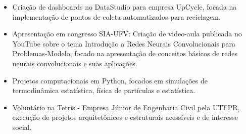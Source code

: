 \documentclass[10pt,a4paper,ragged2e]{altacv}
\begin{document}
\begin{itemize}
\item Criação de dashboards no DataStudio para empresa UpCycle, focada na implementação de pontos de coleta automatizados para reciclagem.\\
\item Apresentação em congresso SIA-UFV: Criação de video-aula publicada no YouTube sobre o tema Introdução a Redes Neurais Convolucionais para Problemas-Modelo, focado na apresentação de conceitos básicos de redes neurais convolucionais e suas aplicações. \\
\item Projetos computacionais em Python, focados em simulações de termodinâmica estatística, física de partículas e estatística. \\
\item Voluntário na Tetris - Empresa Júnior de Engenharia Civil pela UTFPR, execução de projetos arquitetônicos e estruturais acessíveis e de interesse social.
\end{itemize}



\clearpage
\end{document}
